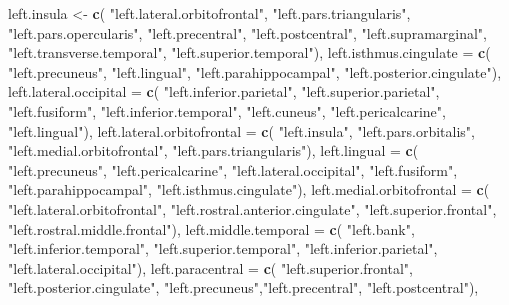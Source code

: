 \documentclass[
]{article}
\newenvironment{Shaded}{\begin{snugshade}}{\end{snugshade}}
\newcommand{\DataTypeTok}[1]{\textcolor[rgb]{0.13,0.29,0.53}{#1}}
\newcommand{\KeywordTok}[1]{\textcolor[rgb]{0.13,0.29,0.53}{\textbf{#1}}}
\newcommand{\NormalTok}[1]{#1}
\newcommand{\StringTok}[1]{\textcolor[rgb]{0.31,0.60,0.02}{#1}}
\begin{document}
\begin{Shaded}
\begin{Highlighting}[]
\NormalTok{ left.insula <-}\StringTok{ }\KeywordTok{c}\NormalTok{(}
   \StringTok{"left.lateral.orbitofrontal"}\NormalTok{, }\StringTok{"left.pars.triangularis"}\NormalTok{,}
   \StringTok{"left.pars.opercularis"}\NormalTok{, }\StringTok{"left.precentral"}\NormalTok{, }\StringTok{"left.postcentral"}\NormalTok{,}
   \StringTok{"left.supramarginal"}\NormalTok{, }\StringTok{"left.transverse.temporal"}\NormalTok{, }\StringTok{"left.superior.temporal"}\NormalTok{),}
 \DataTypeTok{left.isthmus.cingulate =} \KeywordTok{c}\NormalTok{(}
   \StringTok{"left.precuneus"}\NormalTok{, }\StringTok{"left.lingual"}\NormalTok{, }\StringTok{"left.parahippocampal"}\NormalTok{,}
   \StringTok{"left.posterior.cingulate"}\NormalTok{),}
 \DataTypeTok{left.lateral.occipital =} \KeywordTok{c}\NormalTok{(}
   \StringTok{"left.inferior.parietal"}\NormalTok{, }\StringTok{"left.superior.parietal"}\NormalTok{, }\StringTok{"left.fusiform"}\NormalTok{,}
   \StringTok{"left.inferior.temporal"}\NormalTok{,  }\StringTok{"left.cuneus"}\NormalTok{, }\StringTok{"left.pericalcarine"}\NormalTok{,}
   \StringTok{"left.lingual"}\NormalTok{),}
 \DataTypeTok{left.lateral.orbitofrontal =} \KeywordTok{c}\NormalTok{(}
   \StringTok{"left.insula"}\NormalTok{, }\StringTok{"left.pars.orbitalis"}\NormalTok{, }\StringTok{"left.medial.orbitofrontal"}\NormalTok{,}
   \StringTok{"left.pars.triangularis"}\NormalTok{),}
 \DataTypeTok{left.lingual =} \KeywordTok{c}\NormalTok{(}
   \StringTok{"left.precuneus"}\NormalTok{, }\StringTok{"left.pericalcarine"}\NormalTok{, }\StringTok{"left.lateral.occipital"}\NormalTok{,}
   \StringTok{"left.fusiform"}\NormalTok{, }\StringTok{"left.parahippocampal"}\NormalTok{, }\StringTok{"left.isthmus.cingulate"}\NormalTok{),}
 \DataTypeTok{left.medial.orbitofrontal =} \KeywordTok{c}\NormalTok{(}
   \StringTok{"left.lateral.orbitofrontal"}\NormalTok{, }\StringTok{"left.rostral.anterior.cingulate"}\NormalTok{,}
   \StringTok{"left.superior.frontal"}\NormalTok{, }\StringTok{"left.rostral.middle.frontal"}\NormalTok{),}
 \DataTypeTok{left.middle.temporal =} \KeywordTok{c}\NormalTok{(}
   \StringTok{"left.bank"}\NormalTok{, }\StringTok{"left.inferior.temporal"}\NormalTok{, }\StringTok{"left.superior.temporal"}\NormalTok{,}
   \StringTok{"left.inferior.parietal"}\NormalTok{, }\StringTok{"left.lateral.occipital"}\NormalTok{),}
 \DataTypeTok{left.paracentral =} \KeywordTok{c}\NormalTok{(}
   \StringTok{"left.superior.frontal"}\NormalTok{, }\StringTok{"left.posterior.cingulate"}\NormalTok{,}
   \StringTok{"left.precuneus"}\NormalTok{,}\StringTok{"left.precentral"}\NormalTok{, }\StringTok{"left.postcentral"}\NormalTok{),}

\end{Highlighting}
\end{Shaded}
\end{document}
